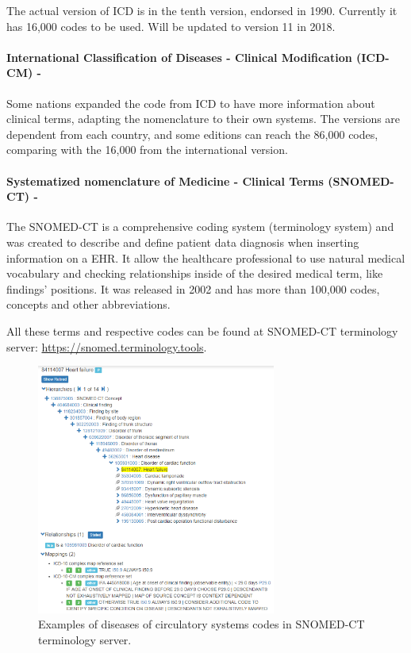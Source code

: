 \documentclass[mim_thesis.tex]{subfiles}
\begin{document}
The actual version of ICD is in the tenth version, endorsed in 1990. Currently it has 16,000 codes to be used. Will be updated to version 11 in 2018. \citep{ICD2018}


\paragraph{\textbf{International Classification of Diseases - Clinical Modification (ICD-CM) -}}
Some nations expanded the code from ICD to have more information about clinical terms, adapting the nomenclature to their own systems. The versions are dependent from each country, and some editions can reach the  86,000 codes, comparing with the 16,000 from the international version. \citep{ICDCM2018}


\paragraph{\textbf{Systematized nomenclature of Medicine - Clinical Terms (SNOMED-CT) -}}
The SNOMED-CT is a comprehensive coding system (terminology system) and was created to describe and define patient data diagnosis when inserting information on a EHR. It allow the healthcare professional to use natural medical vocabulary and checking relationships inside of the desired medical term, like findings’ positions. \citep{SCT2018} It was released in 2002 and has more than 100,000 codes, concepts and other abbreviations. 

All these terms and respective codes can be found at SNOMED-CT terminology server: \url{https://snomed.terminology.tools}.

\begin{figure}[H]
	\centering
    \includegraphics[width=0.7\textwidth]{img/snomed.PNG}
	\caption{Examples of diseases of circulatory systems codes in SNOMED-CT terminology server.}
	\label{fig:snomed_ct}
\end{figure}
\end{document}
